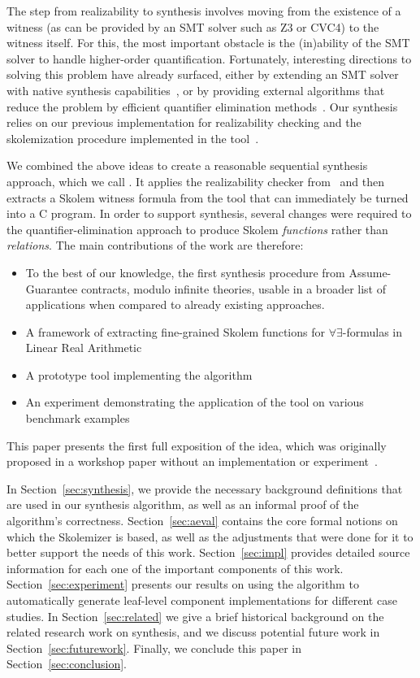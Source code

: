 The step from realizability to synthesis involves moving from the existence of a witness (as can be provided by an SMT solver such as Z3 or CVC4) to the witness itself.  For this, the most important obstacle is the (in)ability of the SMT solver to handle higher-order quantification. Fortunately, interesting directions to solving this problem have already surfaced, either by extending an SMT solver with native synthesis capabilities~\cite{reynoldscounterexample}, or by providing external algorithms that reduce the problem by efficient quantifier elimination methods~\cite{fedyukovichae}.  Our synthesis relies on our previous implementation for realizability checking and the skolemization procedure implemented in the \aeval tool~\cite{fedyukovichae}.


We combined the above ideas to create a reasonable sequential synthesis
approach, which we call \jkindsynt.  It applies the realizability checker
from~\cite{Katis15:Realizability} and then extracts a Skolem witness formula from the \aeval tool that can immediately be turned into a C program.  In order to support synthesis, several changes were required to the quantifier-elimination approach to produce Skolem {\em functions} rather than {\em relations}.  The main contributions of the work are therefore:
\begin{itemize}
	\item To the best of our knowledge, the first synthesis procedure from
	Assume-Guarantee contracts, modulo infinite theories, usable in a broader
	list of applications when compared to already existing approaches.
	\item A framework of extracting fine-grained Skolem functions for $\forall\exists$-formulas in Linear Real Arithmetic
	\item A prototype tool implementing the algorithm
	\item An experiment demonstrating the application of the tool on various benchmark examples
\end{itemize}

\noindent This paper presents the first full exposition of the idea, which was originally proposed in a workshop paper without an implementation or experiment~\cite{katis2016towards}.

In Section~\ref{sec:synthesis}, we provide the necessary background
definitions that are used in our synthesis algorithm, as well as an informal
proof of the algorithm's correctness. Section~\ref{sec:aeval} contains the
core formal notions on which the \aeval Skolemizer is based, as well
as the adjustments that were done for it to better support the needs of this
work. Section~\ref{sec:impl} provides detailed
source information for each one of the important
components of this work. Section~\ref{sec:experiment} presents our results on
using the algorithm to automatically generate leaf-level component implementations for different case studies.
In Section~\ref{sec:related} we give a brief historical background on the
related research work on synthesis, and we discuss potential future work in
Section~\ref{sec:futurework}. Finally, we conclude this paper in
Section~\ref{sec:conclusion}.

